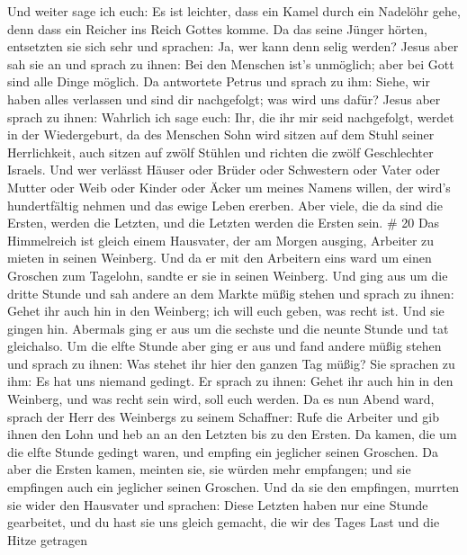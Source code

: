  Und weiter sage ich euch: Es ist leichter, dass ein Kamel
durch ein Nadelöhr gehe, denn dass ein Reicher ins Reich Gottes komme.
 Da das seine Jünger hörten, entsetzten sie sich sehr und
sprachen: Ja, wer kann denn selig werden?  Jesus aber sah
sie an und sprach zu ihnen: Bei den Menschen ist's unmöglich; aber bei
Gott sind alle Dinge möglich.  Da antwortete Petrus und
sprach zu ihm: Siehe, wir haben alles verlassen und sind dir
nachgefolgt; was wird uns dafür?  Jesus aber sprach zu
ihnen: Wahrlich ich sage euch: Ihr, die ihr mir seid nachgefolgt, werdet
in der Wiedergeburt, da des Menschen Sohn wird sitzen auf dem Stuhl
seiner Herrlichkeit, auch sitzen auf zwölf Stühlen und richten die zwölf
Geschlechter Israels.  Und wer verlässt Häuser oder Brüder
oder Schwestern oder Vater oder Mutter oder Weib oder Kinder oder Äcker
um meines Namens willen, der wird's hundertfältig nehmen und das ewige
Leben ererben.  Aber viele, die da sind die Ersten, werden
die Letzten, und die Letzten werden die Ersten sein. \# 20 
Das Himmelreich ist gleich einem Hausvater, der am Morgen ausging,
Arbeiter zu mieten in seinen Weinberg.  Und da er mit den
Arbeitern eins ward um einen Groschen zum Tagelohn, sandte er sie in
seinen Weinberg.  Und ging aus um die dritte Stunde und sah
andere an dem Markte müßig stehen  und sprach zu ihnen:
Gehet ihr auch hin in den Weinberg; ich will euch geben, was recht ist.
 Und sie gingen hin. Abermals ging er aus um die sechste und
die neunte Stunde und tat gleichalso.  Um die elfte Stunde
aber ging er aus und fand andere müßig stehen und sprach zu ihnen: Was
stehet ihr hier den ganzen Tag müßig?  Sie sprachen zu ihm:
Es hat uns niemand gedingt. Er sprach zu ihnen: Gehet ihr auch hin in
den Weinberg, und was recht sein wird, soll euch werden.  Da
es nun Abend ward, sprach der Herr des Weinbergs zu seinem Schaffner:
Rufe die Arbeiter und gib ihnen den Lohn und heb an an den Letzten bis
zu den Ersten.  Da kamen, die um die elfte Stunde gedingt
waren, und empfing ein jeglicher seinen Groschen.  Da aber
die Ersten kamen, meinten sie, sie würden mehr empfangen; und sie
empfingen auch ein jeglicher seinen Groschen.  Und da sie
den empfingen, murrten sie wider den Hausvater  und
sprachen: Diese Letzten haben nur eine Stunde gearbeitet, und du hast
sie uns gleich gemacht, die wir des Tages Last und die Hitze getragen

